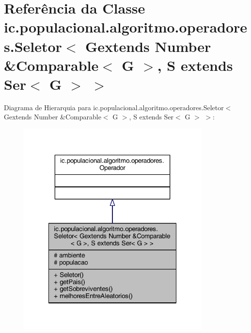 \hypertarget{classic_1_1populacional_1_1algoritmo_1_1operadores_1_1_seletor_3_01_gextends_01_number_01_6_comp1cb45fdcf61805e0533898ec8098c80d}{\section{Referência da Classe ic.\-populacional.\-algoritmo.\-operadores.\-Seletor$<$ Gextends Number \&Comparable$<$ G $>$, S extends Ser$<$ G $>$ $>$}
\label{classic_1_1populacional_1_1algoritmo_1_1operadores_1_1_seletor_3_01_gextends_01_number_01_6_comp1cb45fdcf61805e0533898ec8098c80d}
}


Diagrama de Hierarquia para ic.\-populacional.\-algoritmo.\-operadores.\-Seletor$<$ Gextends Number \&Comparable$<$ G $>$, S extends Ser$<$ G $>$ $>$\-:\nopagebreak
\begin{figure}[H]
\begin{center}
\leavevmode
\includegraphics[width=276pt]{classic_1_1populacional_1_1algoritmo_1_1operadores_1_1_seletor_3_01_gextends_01_number_01_6_compec09d7b83b15971dfa64d597afa771eb}
\end{center}
\end{figure}


